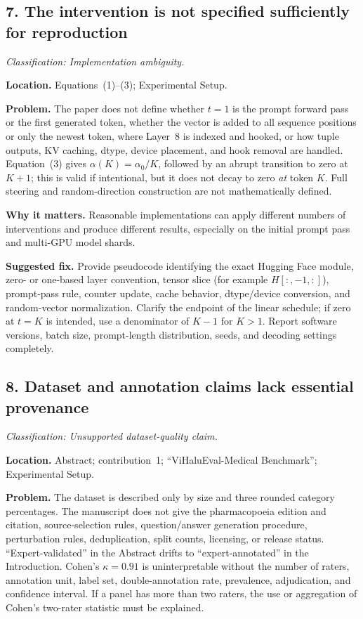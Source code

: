 \documentclass[11pt]{article}
\newcommand{\findinglabel}[1]{\textbf{#1}}
\newcommand{\classification}[1]{\textit{Classification: #1.}}
\begin{document}
\subsection*{7. The intervention is not specified sufficiently for reproduction}

\classification{Implementation ambiguity}

\findinglabel{Location.} Equations~(1)--(3); Experimental Setup.

\findinglabel{Problem.} The paper does not define whether $t=1$ is the prompt forward pass or the first generated token, whether the vector is added to all sequence positions or only the newest token, where Layer~8 is indexed and hooked, or how tuple outputs, KV caching, dtype, device placement, and hook removal are handled.  Equation~(3) gives $\alpha(K)=\alpha_0/K$, followed by an abrupt transition to zero at $K+1$; this is valid if intentional, but it does not decay to zero \emph{at} token $K$.  Full steering and random-direction construction are not mathematically defined.

\findinglabel{Why it matters.} Reasonable implementations can apply different numbers of interventions and produce different results, especially on the initial prompt pass and multi-GPU model shards.

\findinglabel{Suggested fix.} Provide pseudocode identifying the exact Hugging Face module, zero- or one-based layer convention, tensor slice (for example $H[:, -1, :]$), prompt-pass rule, counter update, cache behavior, dtype/device conversion, and random-vector normalization.  Clarify the endpoint of the linear schedule; if zero at $t=K$ is intended, use a denominator of $K-1$ for $K>1$.  Report software versions, batch size, prompt-length distribution, seeds, and decoding settings completely.

\subsection*{8. Dataset and annotation claims lack essential provenance}

\classification{Unsupported dataset-quality claim}

\findinglabel{Location.} Abstract; contribution~1; ``ViHaluEval-Medical Benchmark''; Experimental Setup.

\findinglabel{Problem.} The dataset is described only by size and three rounded category percentages.  The manuscript does not give the pharmacopoeia edition and citation, source-selection rules, question/answer generation procedure, perturbation rules, deduplication, split counts, licensing, or release status.  ``Expert-validated'' in the Abstract drifts to ``expert-annotated'' in the Introduction.  Cohen's $\kappa=0.91$ is uninterpretable without the number of raters, annotation unit, label set, double-annotation rate, prevalence, adjudication, and confidence interval.  If a panel has more than two raters, the use or aggregation of Cohen's two-rater statistic must be explained.
\end{document}
